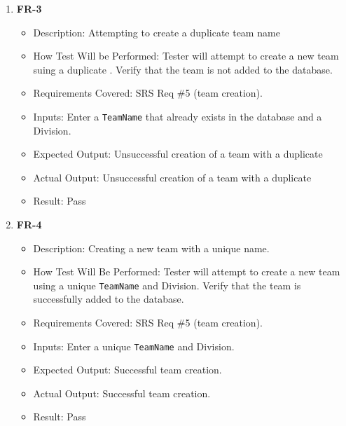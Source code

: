 \documentclass[12pt, titlepage]{article}
\begin{document}
\begin{enumerate}
       \item \textbf{FR-3}
          \begin{itemize}
              \item Description: Attempting to create a duplicate team name
              \item How Test Will be Performed: Tester will attempt to create a new team suing a duplicate . Verify that the team is not added to the database.
              \item Requirements Covered: SRS Req \#5 (team creation).
              \item Inputs: Enter a \texttt{TeamName} that already exists in the database and a Division.
              \item Expected Output: Unsuccessful creation of a team with a duplicate
              \item Actual Output: Unsuccessful creation of a team with a duplicate
              \item Result: Pass
          \end{itemize}

      \item \textbf{FR-4}  
      \begin{itemize}
          \item Description: Creating a new team with a unique name.
          \item How Test Will Be Performed: Tester will attempt to create a new team using a unique \texttt{TeamName} and Division. Verify that the team is successfully added to the database.
          \item Requirements Covered: SRS Req \#5 (team creation).
          \item Inputs: Enter a unique \texttt{TeamName} and Division.
          \item Expected Output: Successful team creation.
          \item Actual Output: Successful team creation.
          \item Result: Pass
      \end{itemize}


\end{enumerate}
\end{document}
